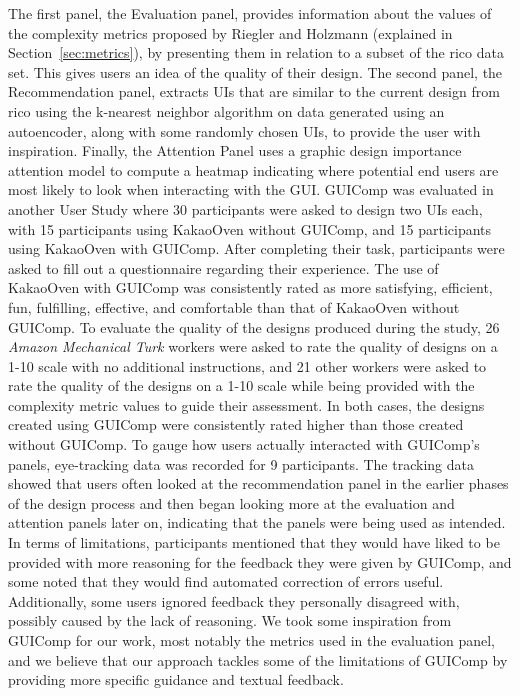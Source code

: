 \documentclass[11pt,titlepage,oneside,openany]{book}
\begin{document}
The first panel, the Evaluation panel, provides information about the values of the complexity metrics proposed by Riegler and Holzmann \cite{riegler_measuring_2018} (explained in Section~\ref{sec:metrics}), by presenting them in relation to a subset of the rico data set. This gives users an idea of the quality of their design. The second panel, the Recommendation panel, extracts UIs that are similar to the current design from rico using the k-nearest neighbor algorithm on data generated using an autoencoder, along with some randomly chosen UIs, to provide the user with inspiration. Finally, the Attention Panel uses a graphic design importance attention model \cite{bylinskii_learning_2017} to compute a heatmap indicating where potential end users are most likely to look when interacting with the GUI. GUIComp was evaluated in another User Study where 30 participants were asked to design two UIs each, with 15 participants using KakaoOven without GUIComp, and 15 participants using KakaoOven with GUIComp. After completing their task, participants were asked to fill out a questionnaire regarding their experience. The use of KakaoOven with GUIComp was consistently rated as more satisfying, efficient, fun, fulfilling, effective, and comfortable than that of KakaoOven without GUIComp. To evaluate the quality of the designs produced during the study, 26 \emph{Amazon Mechanical Turk} \cite{noauthor_amazon_nodate-1} workers were asked to rate the quality of designs on a 1-10 scale with no additional instructions, and 21 other workers were asked to rate the quality of the designs on a 1-10 scale while being provided with the complexity metric values to guide their assessment. In both cases, the designs created using GUIComp were consistently rated higher than those created without GUIComp. To gauge how users actually interacted with GUIComp's panels, eye-tracking data was recorded for 9 participants. The tracking data showed that users often looked at the recommendation panel in the earlier phases of the design process and then began looking more at the evaluation and attention panels later on, indicating that the panels were being used as intended. In terms of limitations, participants mentioned that they would have liked to be provided with more reasoning for the feedback they were given by GUIComp, and some noted that they would find automated correction of errors useful. Additionally, some users ignored feedback they personally disagreed with, possibly caused by the lack of reasoning. We took some inspiration from GUIComp for our work, most notably the metrics used in the evaluation panel, and we believe that our approach tackles some of the limitations of GUIComp by providing more specific guidance and textual feedback.
\end{document}
